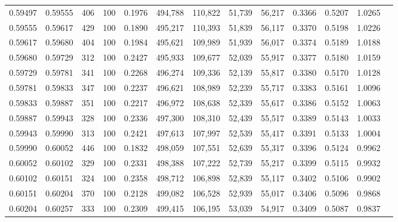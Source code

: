 \begin{tabular}{rrrrrrrrrrrrr}
0.59497 & 0.59555 &   406 & 100 &                                     0.1976 & 494,788 & 110,822 &  51,739 &  56,217 & 0.3366 & 0.5207 & 1.0265 \\
0.59555 & 0.59617 &   429 & 100 &                                     0.1890 & 495,217 & 110,393 &  51,839 &  56,117 & 0.3370 & 0.5198 & 1.0226 \\
0.59617 & 0.59680 &   404 & 100 &                                     0.1984 & 495,621 & 109,989 &  51,939 &  56,017 & 0.3374 & 0.5189 & 1.0188 \\
0.59680 & 0.59729 &   312 & 100 &                                     0.2427 & 495,933 & 109,677 &  52,039 &  55,917 & 0.3377 & 0.5180 & 1.0159 \\
0.59729 & 0.59781 &   341 & 100 &                                     0.2268 & 496,274 & 109,336 &  52,139 &  55,817 & 0.3380 & 0.5170 & 1.0128 \\
0.59781 & 0.59833 &   347 & 100 &                                     0.2237 & 496,621 & 108,989 &  52,239 &  55,717 & 0.3383 & 0.5161 & 1.0096 \\
0.59833 & 0.59887 &   351 & 100 &                                     0.2217 & 496,972 & 108,638 &  52,339 &  55,617 & 0.3386 & 0.5152 & 1.0063 \\
0.59887 & 0.59943 &   328 & 100 &                                     0.2336 & 497,300 & 108,310 &  52,439 &  55,517 & 0.3389 & 0.5143 & 1.0033 \\
0.59943 & 0.59990 &   313 & 100 &                                     0.2421 & 497,613 & 107,997 &  52,539 &  55,417 & 0.3391 & 0.5133 & 1.0004 \\
0.59990 & 0.60052 &   446 & 100 &                                     0.1832 & 498,059 & 107,551 &  52,639 &  55,317 & 0.3396 & 0.5124 & 0.9962 \\
0.60052 & 0.60102 &   329 & 100 &                                     0.2331 & 498,388 & 107,222 &  52,739 &  55,217 & 0.3399 & 0.5115 & 0.9932 \\
0.60102 & 0.60151 &   324 & 100 &                                     0.2358 & 498,712 & 106,898 &  52,839 &  55,117 & 0.3402 & 0.5106 & 0.9902 \\
0.60151 & 0.60204 &   370 & 100 &                                     0.2128 & 499,082 & 106,528 &  52,939 &  55,017 & 0.3406 & 0.5096 & 0.9868 \\
0.60204 & 0.60257 &   333 & 100 &                                     0.2309 & 499,415 & 106,195 &  53,039 &  54,917 & 0.3409 & 0.5087 & 0.9837 \\

\end{tabular}
